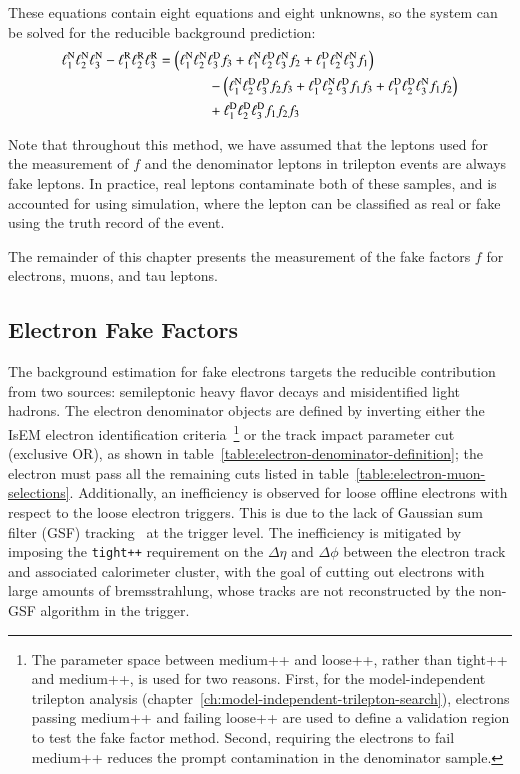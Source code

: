 These equations contain eight equations and eight unknowns, so the system can be solved for the reducible background prediction:
\begin{align} \label{eq:fake-factor-master-formula}
	\ell_{1}^{\mathrm{N}}\ell_{2}^{\mathrm{N}}\ell_{3}^{\mathrm{N}} - \ell_{1}^{\mathrm{R}}\ell_{2}^{\mathrm{R}}\ell_{3}^{\mathrm{R}} &= \left( \ell_{1}^{\mathrm{N}}\ell_{2}^{\mathrm{N}}\ell_{3}^{\mathrm{D}} f_{3} + \ell_{1}^{\mathrm{N}}\ell_{2}^{\mathrm{D}}\ell_{3}^{\mathrm{N}} f_{2}  + \ell_{1}^{\mathrm{D}}\ell_{2}^{\mathrm{N}}\ell_{3}^{\mathrm{N}} f_{1}\right)  \\
		 & \hspace{0.5in} - \left( \ell_{1}^{\mathrm{N}}\ell_{2}^{\mathrm{D}}\ell_{3}^{\mathrm{D}} f_{2}f_{3} + \ell_{1}^{\mathrm{D}}\ell_{2}^{\mathrm{N}}\ell_{3}^{\mathrm{D}} f_{1}f_{3} + \ell_{1}^{\mathrm{D}}\ell_{2}^{\mathrm{D}}\ell_{3}^{\mathrm{N}} f_{1}f_{2}\right) \\
		 & \hspace{0.5in} + \ell_{1}^{\mathrm{D}}\ell_{2}^{\mathrm{D}}\ell_{3}^{\mathrm{D}} f_{1}f_{2}f_{3}
\end{align}

Note that throughout this method, we have assumed that the leptons used for the measurement of $f$ and the denominator leptons in trilepton events are always fake leptons. In practice, real leptons contaminate both of these samples, and is accounted for using simulation, where the lepton can be classified as real or fake using the truth record of the event.

The remainder of this chapter presents the measurement of the fake factors $f$ for electrons, muons, and tau leptons. 

\subsection{Electron Fake Factors}\label{sec:electron-fake-factors}
The background estimation for fake electrons targets the reducible contribution from two sources: semileptonic heavy flavor decays and misidentified light hadrons. The electron denominator objects are defined by inverting either the IsEM electron identification criteria~\footnote{The parameter space between medium++ and loose++, rather than tight++ and medium++, is used for two reasons. First, for the model-independent trilepton analysis (chapter~\ref{ch:model-independent-trilepton-search}), electrons passing medium++ and failing loose++ are used to define a validation region to test the fake factor method. Second, requiring the electrons to fail medium++ reduces the prompt contamination in the denominator sample.} or the track impact parameter cut (exclusive OR), as shown in table~\ref{table:electron-denominator-definition}; the electron must pass all the remaining cuts listed in table~\ref{table:electron-muon-selections}. Additionally, an inefficiency is observed for loose offline electrons with respect to the loose electron triggers. This is due to the lack of Gaussian sum filter (GSF) tracking~\cite{TheATLASCollaboration:2012vr} at the trigger level. The inefficiency is mitigated by imposing the \verb.tight++. requirement on the $\Delta\eta$ and $\Delta\phi$ between the electron track and associated calorimeter cluster, with the goal of cutting out electrons with large amounts of bremsstrahlung, whose tracks are not reconstructed by the non-GSF algorithm in the trigger. 


